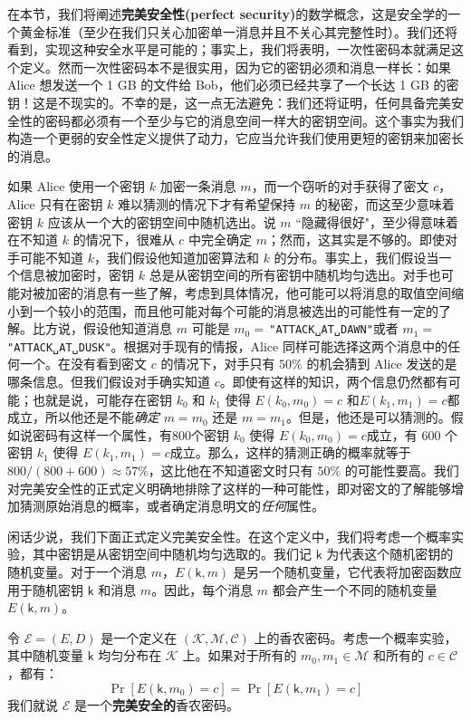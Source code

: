 在本节，我们将阐述\textbf{完美安全性(perfect security)}的数学概念，这是安全学的一个黄金标准（至少在我们只关心加密单一消息并且不关心其完整性时）。我们还将看到，实现这种安全水平是可能的；事实上，我们将表明，一次性密码本就满足这个定义。然而一次性密码本不是很实用，因为它的密钥必须和消息一样长：如果 Alice 想发送一个 1 GB 的文件给 Bob，他们必须已经共享了一个长达 1 GB 的密钥！这是不现实的。不幸的是，这一点无法避免：我们还将证明，任何具备完美安全性的密码都必须有一个至少与它的消息空间一样大的密钥空间。这个事实为我们构造一个更弱的安全性定义提供了动力，它应当允许我们使用更短的密钥来加密长的消息。

如果 Alice 使用一个密钥 $k$ 加密一条消息 $m$，而一个窃听的对手获得了密文 $c$，Alice 只有在密钥 $k$ 难以猜测的情况下才有希望保持 $m$ 的秘密，而这至少意味着密钥 $k$ 应该从一个大的密钥空间中随机选出。说 $m$ ``隐藏得很好"，至少得意味着在不知道 $k$ 的情况下，很难从 $c$ 中完全确定 $m$；然而，这其实是不够的。即使对手可能不知道 $k$，我们假设他知道加密算法和 $k$ 的分布。事实上，我们假设当一个信息被加密时，密钥 $k$ 总是从密钥空间的所有密钥中随机均匀选出。对手也可能对被加密的消息有一些了解，考虑到具体情况，他可能可以将消息的取值空间缩小到一个较小的范围，而且他可能对每个可能的消息被选出的可能性有一定的了解。比方说，假设他知道消息 $m$ 可能是 $m_0=\,$\texttt{"ATTACK␣AT␣DAWN"}或者 $m_1=\,$\texttt{"ATTACK␣AT␣DUSK"}。根据对手现有的情报，Alice 同样可能选择这两个消息中的任何一个。在没有看到密文 $c$ 的情况下，对手只有 $50\%$ 的机会猜到 Alice 发送的是哪条信息。但我们假设对手确实知道 $c$。即使有这样的知识，两个信息仍然都有可能；也就是说，可能存在密钥 $k_0$ 和 $k_1$ 使得 $E(k_0,m_0)=c$ 和$E(k_1,m_1)=c$都成立，所以他还是不能\emph{确定} $m=m_0$ 还是 $m=m_1$。但是，他还是可以猜测的。假如说密码有这样一个属性，有800个密钥 $k_0$ 使得 $E(k_0,m_0)=c$成立，有 600 个密钥 $k_1$ 使得 $E(k_1,m_1)=c$成立。那么，这样的猜测正确的概率就等于 $800/(800+600)\approx57\%$，这比他在不知道密文时只有 $50\%$ 的可能性要高。我们对完美安全性的正式定义明确地排除了这样的一种可能性，即对密文的了解能够增加猜测原始消息的概率，或者确定消息明文的\emph{任何}属性。

闲话少说，我们下面正式定义完美安全性。在这个定义中，我们将考虑一个概率实验，其中密钥是从密钥空间中随机均匀选取的。我们记 $\mathsf{k}$ 为代表这个随机密钥的随机变量。对于一个消息 $m$，$E(\mathsf{k},m)$ 是另一个随机变量，它代表将加密函数应用于随机密钥 $\mathsf{k}$ 和消息 $m$。因此，每个消息 $m$ 都会产生一个不同的随机变量 $E(\mathsf{k},m)$。

\begin{definition}[完美安全性]
令 $\mathcal{E}=(E,D)$ 是一个定义在 $(\mathcal{K},\mathcal{M},\mathcal{C})$ 上的香农密码。考虑一个概率实验，其中随机变量 $\mathsf{k}$ 均匀分布在 $\mathcal{K}$ 上。如果对于所有的 $m_0,m_1\in\mathcal{M}$ 和所有的 $c\in\mathcal{C}$，都有：
$$
\Pr[E(\mathsf{k},m_0)=c]=\Pr[E(\mathsf{k},m_1)=c]
$$
我们就说 $\mathcal{E}$ 是一个\textbf{完美安全的}香农密码。
\end{definition}

